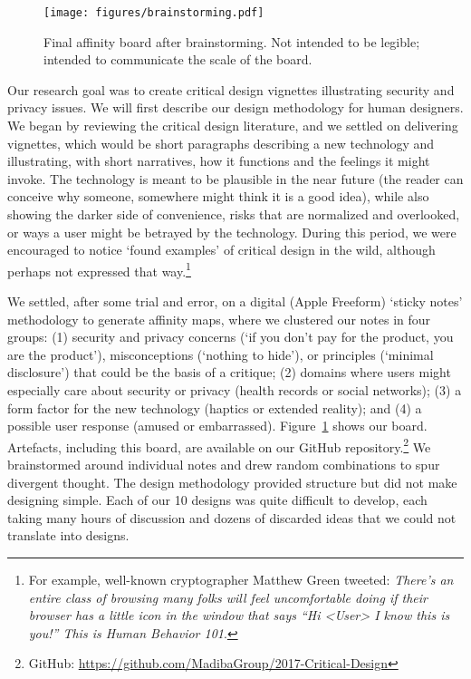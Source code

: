 \begin{figure}[t]
\begin{center}
\texttt{[image: figures/brainstorming.pdf]}
\caption{Final affinity board after brainstorming. Not intended to be legible; intended to communicate the scale of the board.\label{fig:board}}
\end{center}
\end{figure}


Our research goal was to create critical design vignettes illustrating security and privacy issues. We will first describe our design methodology for human designers. We began by reviewing the critical design literature, and we settled on delivering vignettes, which would be short paragraphs describing a new technology and illustrating, with short narratives, how it functions and the feelings it might invoke. The technology is meant to be plausible in the near future (the reader can conceive why someone, somewhere might think it is a good idea), while also showing the darker side of convenience, risks that are normalized and overlooked, or ways a user might be betrayed by the technology. During this period, we were encouraged to notice `found examples' of critical design in the wild, although perhaps not expressed that way.\footnote{For example, well-known cryptographer Matthew Green tweeted: \textit{There’s an entire class of browsing many folks will feel uncomfortable doing if their browser has a little icon in the window that says “Hi <User> I know this is you!” This is Human Behavior 101}.}

We settled, after some trial and error, on a digital (Apple Freeform) `sticky notes' methodology to generate affinity maps, where we clustered our notes in four groups: (1) security and privacy concerns (\eg `if you don't pay for the product, you are the product'), misconceptions (\eg `nothing to hide'), or principles (\eg `minimal disclosure')  that could be the basis of a critique; (2) domains where users might especially care about security or privacy (\eg health records or social networks); (3) a form factor for the new technology (\eg haptics or extended reality); and (4) a possible user response (\eg amused or embarrassed). Figure~\ref{fig:board} shows our board. Artefacts, including this board, are available on our GitHub repository.\footnote{GitHub: \url{https://github.com/MadibaGroup/2017-Critical-Design}} We brainstormed around individual notes and drew random combinations to spur divergent thought. The design methodology provided structure but did not make designing simple. Each of our 10 designs was quite difficult to develop, each taking many hours of discussion and dozens of discarded ideas that we could not translate into designs. 

